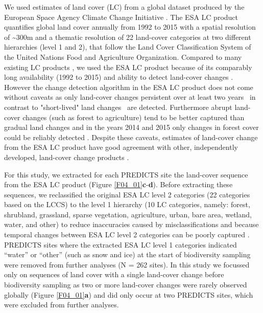 We used estimates of land cover (LC) from a global dataset produced by the European Space Agency Climate Change Initiative \citep[][ver. 2.0.7 obtained from \href{http://maps.elie.ucl.ac.be/CCI}{http://maps.elie.ucl.ac.be/CCI} ]{ESA2017}. The ESA LC product quantifies global land cover annually from 1992 to 2015 with a spatial resolution of \textasciitilde 300m \citep{ESA2017} and a thematic resolution of 22 land-cover categories \citep[75.38\% global accuracy, ][]{ESA2017} at two different hierarchies (level 1 and 2), that follow the Land Cover Classification System \citep[LCCS, ][]{DiGregorio2000} of the United Nations Food and Agriculture Organization. Compared to many existing LC products \citep{Grekousis2015}, we used the ESA LC product because of its comparably long availability (1992 to 2015) and ability to detect land-cover changes \citep{ESA2017}. However the change detection algorithm in the ESA LC product does not come without caveats as only land-cover changes persistent over at least two years \textendash\ in contrast to "short-lived" land changes \citep{Lambin2006} \textendash\ are detected. Furthermore abrupt land-cover changes (such as forest to agriculture) tend to be better captured than gradual land changes \citep{ESA2017} and in the years 2014 and 2015 only changes in forest cover could be reliably detected \citep{ESA2017}. Despite these caveats, estimates of land-cover change from the ESA LC product have good agreement with other, independently developed, land-cover change products \citep{Li2018}.

For this study, we extracted for each PREDICTS site the land-cover sequence from the ESA LC product (Figure \ref{F04_01}\textbf{c}-\textbf{d}). Before extracting these sequences, we reclassified the original ESA LC level 2 categories (22 categories based on the LCCS) to the level 1 hierarchy (10 LC categories, namely: forest, shrubland, grassland, sparse vegetation, agriculture, urban, bare area, wetland, water, and other) to reduce inaccuracies caused by misclassifications and because temporal changes between ESA LC level 2 categories can be poorly captured \citep{ESA2017}. PREDICTS sites where the extracted ESA LC level 1 categories indicated “water” or “other” (such as snow and ice) at the start of biodiversity sampling were removed from further analyses (N = 262 sites). In this study we focussed only on sequences of land cover with a single land-cover change before biodiversity sampling as two or more land-cover changes were rarely observed globally (Figure \ref{F04_01}\textbf{a}) and did only occur at two PREDICTS sites, which were excluded from further analyses.  

